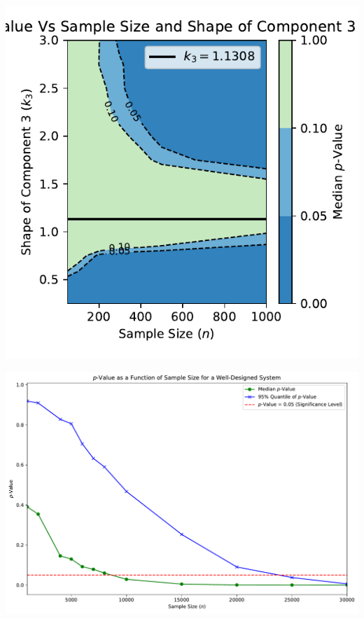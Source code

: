 \documentclass{article}
\begin{document}
\pagestyle{empty}

\noindent
\begin{minipage}[t]{0.45\textwidth}
  \centering
  \includegraphics[width=\textwidth,height=0.33\textheight,keepaspectratio]{contour_plot.pdf}
\end{minipage}%
\hspace{0.05\textwidth} %
\begin{minipage}[t]{0.45\textwidth}
  \centering
  \includegraphics[width=\textwidth,height=0.33\textheight,keepaspectratio]{n-vs-p-value.pdf}
\end{minipage}
\end{document}
